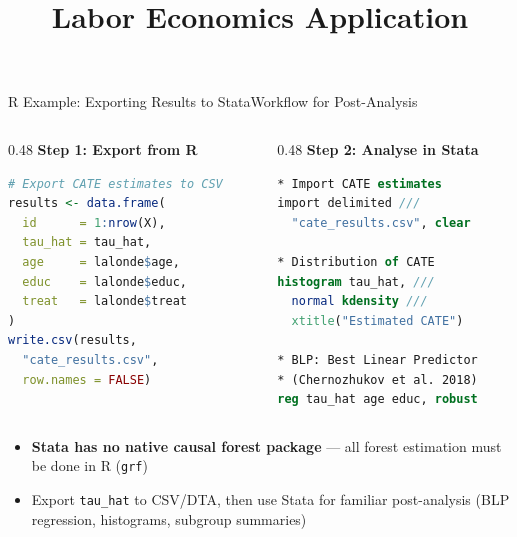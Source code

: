 \documentclass[hyperref={pdfpagelabels=false}]{beamer}
\begin{document}
\begin{frame}[fragile]{R Example: Exporting Results to Stata}{Workflow for Post-Analysis}
\begin{columns}[T]
\begin{column}{0.48\textwidth}
\textbf{Step 1: Export from R}
\vspace{0.15cm}

\begin{lstlisting}[language=R]
# Export CATE estimates to CSV
results <- data.frame(
  id      = 1:nrow(X),
  tau_hat = tau_hat,
  age     = lalonde$age,
  educ    = lalonde$educ,
  treat   = lalonde$treat
)
write.csv(results,
  "cate_results.csv",
  row.names = FALSE)
\end{lstlisting}
\end{column}
\hfill
\begin{column}{0.48\textwidth}
\textbf{Step 2: Analyse in Stata}
\vspace{0.15cm}

\begin{lstlisting}[language=Stata]
* Import CATE estimates
import delimited ///
  "cate_results.csv", clear

* Distribution of CATE
histogram tau_hat, ///
  normal kdensity ///
  xtitle("Estimated CATE")

* BLP: Best Linear Predictor
* (Chernozhukov et al. 2018)
reg tau_hat age educ, robust
\end{lstlisting}
\end{column}
\end{columns}
\vspace{0.2cm}
\begin{itemize}
  \item \textbf{Stata has no native causal forest package} — all forest estimation must be done in R (\texttt{grf})
  \item Export \texttt{tau\_hat} to CSV/DTA, then use Stata for familiar post-analysis (BLP regression, histograms, subgroup summaries)
\end{itemize}
\end{frame}




\title[]
{Labor Economics Application}

\author{}
\institute{}
\date{}

\begin{frame}{}
	\titlepage
\end{frame}
\end{document}
